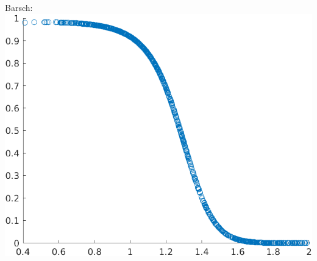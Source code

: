 \documentclass[a4paper]{scrartcl}
\begin{document}
\begin{itemize}
	Barsch:\\
	\includegraphics*[scale=0.5]{assignment2_data/plots/cond_function_seabass.png}
	
\end{itemize}
\end{document}
